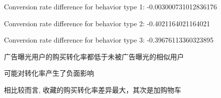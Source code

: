 \documentclass[a4paper]{article}
\begin{document}
Conversion rate difference for behavior type 1: -0.003000731012836176

Conversion rate difference for behavior type 2: -0.4021164021164021

Conversion rate difference for behavior type 3: -0.39676113360323895

广告曝光用户的购买转化率都低于未被广告曝光的相似用户

可能对转化率产生了负面影响

相比较而言, 收藏的购买转化率差异最大，其次是加购物车
\end{document}
